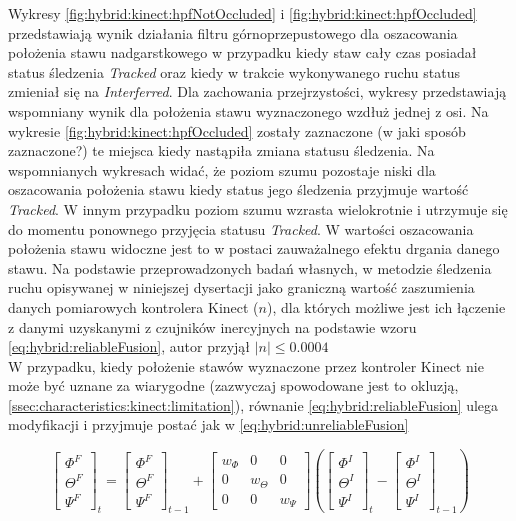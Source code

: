 Wykresy \ref{fig:hybrid:kinect:hpfNotOccluded} i \ref{fig:hybrid:kinect:hpfOccluded} przedstawiają wynik działania filtru górnoprzepustowego dla oszacowania położenia stawu nadgarstkowego w przypadku kiedy staw cały czas posiadał status śledzenia \emph{Tracked} oraz kiedy w trakcie wykonywanego ruchu status zmieniał się na \emph{Interferred}. Dla zachowania przejrzystości, wykresy przedstawiają wspomniany wynik dla położenia stawu wyznaczonego wzdłuż jednej z osi. Na wykresie \ref{fig:hybrid:kinect:hpfOccluded} zostały zaznaczone (w jaki sposób zaznaczone?) te miejsca kiedy nastąpiła zmiana statusu śledzenia. Na wspomnianych wykresach widać, że poziom szumu pozostaje niski dla oszacowania położenia stawu kiedy status jego śledzenia przyjmuje wartość \emph{Tracked}. W innym przypadku poziom szumu wzrasta wielokrotnie i utrzymuje się do momentu ponownego przyjęcia statusu  \emph{Tracked}. W wartości oszacowania położenia stawu widoczne jest to w postaci zauważalnego efektu drgania danego stawu. Na podstawie przeprowadzonych badań własnych, w metodzie śledzenia ruchu opisywanej w niniejszej dysertacji jako graniczną wartość zaszumienia danych pomiarowych kontrolera Kinect ($n$), dla których możliwe jest ich łączenie z danymi uzyskanymi z czujników inercyjnych na podstawie wzoru \eqref{eq:hybrid:reliableFusion}, autor przyjął $|n| \le 0.0004$\\

W przypadku, kiedy położenie stawów wyznaczone przez kontroler Kinect nie może być uznane za wiarygodne (zazwyczaj spowodowane jest to okluzją, \ref{ssec:characteristics:kinect:limitation}), równanie \eqref{eq:hybrid:reliableFusion} ulega modyfikacji i przyjmuje postać jak w \eqref{eq:hybrid:unreliableFusion} 

\begin{equation}
	\label{eq:hybrid:unreliableFusion}
	\begin{bmatrix}  \Phi^F \\  \Theta^F \\  \Psi^F \end{bmatrix}_t = 
	\begin{bmatrix}  \Phi^F \\  \Theta^F \\  \Psi^F \end{bmatrix}_{t-1} + 
	\begin{bmatrix}  w_\Phi&0&0 \\  0&w_\Theta&0 \\  0&0&w_\Psi \end{bmatrix}
	(\begin{bmatrix}  \Phi^I \\  \Theta^I \\  \Psi^I \end{bmatrix}_t -
	\begin{bmatrix}  \Phi^I \\  \Theta^I \\  \Psi^I \end{bmatrix}_{t-1})
\end{equation}

